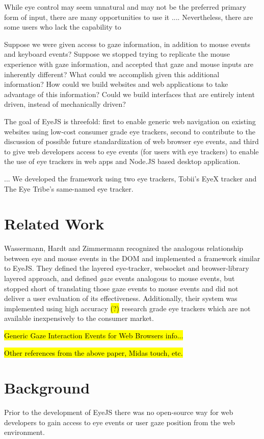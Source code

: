 \documentclass{sigchi}
\begin{document}
While eye control may seem unnatural and may not be the preferred primary form of input, there are many opportunities to use it .... Nevertheless, there are some users who lack the capability to 

Suppose we were given access to gaze information, in addition to mouse events and keyboard events? Suppose we stopped trying to replicate the mouse experience with gaze information, and accepted that gaze and mouse inputs are inherently different? What could we accomplish given this additional information? How could we build websites and web applications to take advantage of this information? Could we build interfaces that are entirely intent driven, instead of mechanically driven?

The goal of EyeJS is threefold: first to enable generic web navigation on existing websites using low-cost consumer grade eye trackers, second to contribute to the discussion of possible future standardization of web browser eye events, and third to give web developers access to eye events (for users with eye trackers) to enable the use of eye trackers in web apps and Node.JS based desktop application.

... We developed the framework using two eye trackers, Tobii's EyeX
tracker and The Eye Tribe's same-named eye tracker.



\section{Related Work}

Wassermann, Hardt and Zimmermann recognized the analogous relationship between eye and mouse events in the DOM and implemented a framework similar to EyeJS. They defined the layered eye-tracker, websocket and browser-library layered approach, and defined \emph{gaze} events analogous to mouse events, but stopped short of translating those gaze events to mouse events and did not deliver a user evaluation of its effectiveness. Additionally, their system was implemented using high accuracy \hl{(?)} research grade eye trackers which are not available inexpensively to the consumer market.




\hl{Generic Gaze Interaction Events for Web Browsers info...}

\hl{Other references from the above paper, Midas touch, etc.}



\section{Background}
Prior to the development of EyeJS there was no open-source way for web developers to gain access to eye events or user gaze position from the web environment.
\end{document}
